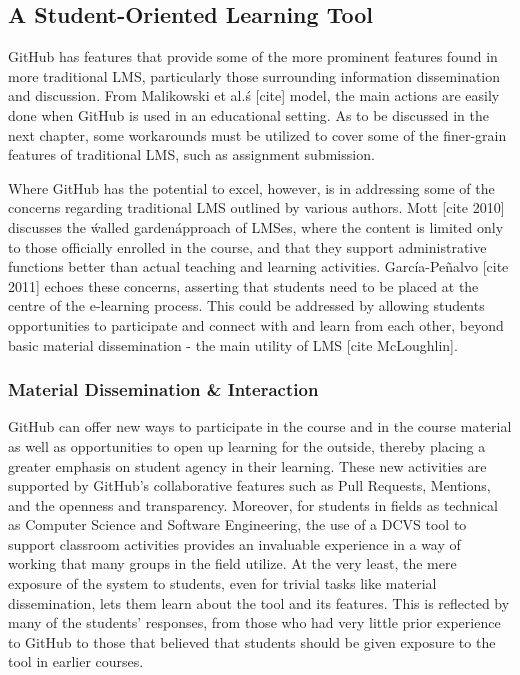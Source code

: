 \subsection{A Student-Oriented Learning Tool}
GitHub has features that provide some of the more prominent features found in more traditional LMS, particularly those surrounding information dissemination and discussion. From Malikowski et al.\'s [cite] model, the main actions are easily done when GitHub is used in an educational setting. As to be discussed in the next chapter, some workarounds must be utilized to cover some of the finer-grain features of traditional LMS, such as assignment submission.

Where GitHub has the potential to excel, however, is in addressing some of the concerns regarding traditional LMS outlined by various authors. Mott [cite 2010] discusses the \'walled garden\' approach of LMSes, where the content is limited only to those officially enrolled in the course, and that they support administrative functions better than actual teaching and learning activities. García-Peñalvo [cite 2011] echoes these concerns, asserting that students need to be placed at the centre of the e-learning process. This could be addressed by allowing students opportunities to participate and connect with and learn from each other, beyond basic material dissemination - the main utility of LMS [cite McLoughlin].

\subsubsection{Material Dissemination & Interaction}
GitHub can offer new ways to participate in the course and in the course material as well as opportunities to open up learning for the outside, thereby placing a greater emphasis on student agency in their learning. These new activities are supported by GitHub's collaborative features such as Pull Requests, Mentions, and the openness and transparency. Moreover, for students in fields as technical as Computer Science and Software Engineering, the use of a DCVS tool to support classroom activities provides an invaluable experience in a way of working that many groups in the field utilize. At the very least, the mere exposure of the system to students, even for trivial tasks like material dissemination, lets them learn about the tool and its features. This is reflected by many of the students' responses, from those who had very little prior experience to GitHub to those that believed that students should be given exposure to the tool in earlier courses.


